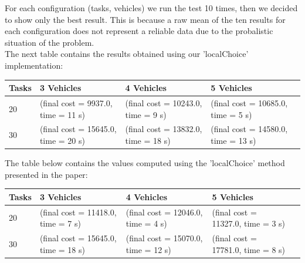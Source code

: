\documentclass[11pt]{article}
\begin{document}
For each configuration (tasks, vehicles) we  run the test 10 times, then we decided to show only the best result. This is because a raw mean of the ten results for each configuration does not represent a reliable data due to the probalistic situation of the problem. 
\\
The next table contains the results obtained using our 'localChoice' implementation:
\small
\begin{center}
    \begin{tabular}{ | l | l | l | l | l |}
    \hline
    \textbf{Tasks} & \textbf{3 Vehicles} & \textbf{4 Vehicles} & \textbf{5 Vehicles}\\ \hline
    20 & (final cost = 9937.0, time = 11 s) & (final cost = 10243.0, time = 9 s) & (final cost = 10685.0, time = 5 s)\\ \hline
    30 & (final cost = 15645.0, time = 20 s) & (final cost = 13832.0, time = 18 s) & (final cost = 14580.0, time = 13 s)\\ \hline
    \end{tabular}
\end{center}
\normalsize
The table below contains the values computed using the 'localChoice' method presented in the paper:
\small
\begin{center}
    \begin{tabular}{ | l | l | l | l | l |}
    \hline
    \textbf{Tasks} & \textbf{3 Vehicles} & \textbf{4 Vehicles} & \textbf{5 Vehicles}\\ \hline
    20 & (final cost = 11418.0, time = 7 s) & (final cost = 12046.0, time = 4 s) & (final cost = 11327.0, time = 3 s)\\ \hline
    30 & (final cost = 15645.0, time = 18 s) & (final cost = 15070.0, time = 12 s) & (final cost = 17781.0, time = 8 s)\\ \hline
    \end{tabular}
\end{center}
\normalsize
\end{document}

